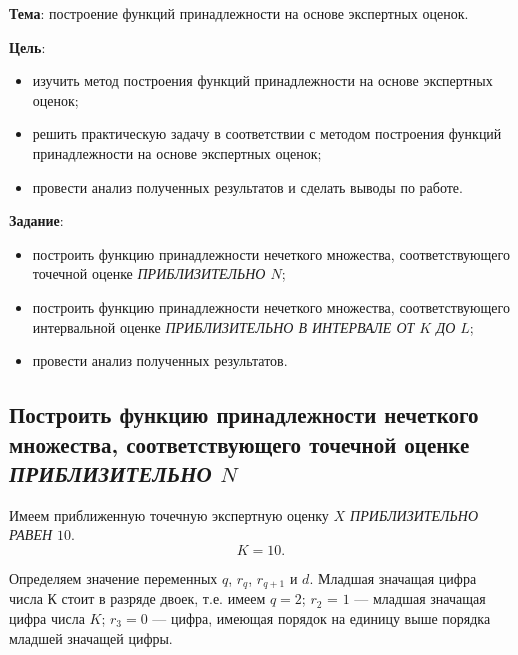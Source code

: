 


\newcommand{\labnumber}{4} %



\usepackage{systeme}
\usepackage{longtable,tabu}
\usepackage{multirow}
\usepackage{array,multirow}
\usepackage{pdflscape}
\usepackage{afterpage}
\usepackage{tikz}
\usepackage{bm}

\graphicspath{{figures/}}


\Russian


\addtocounter{page}{1}

\textbf{Тема}: построение функций принадлежности на основе экспертных оценок.

\textbf{Цель}: 
\begin{itemize}
	\item изучить метод построения функций принадлежности на основе экспертных оценок;
	\item решить практическую задачу в соответствии с методом построения функций принадлежности на основе экспертных оценок;
	\item провести анализ полученных результатов и сделать выводы по работе.
\end{itemize}

\textbf{Задание}: 
\begin{itemize}
	\item построить функцию принадлежности нечеткого множества, соответствующего точечной оценке \textit{ПРИБЛИЗИТЕЛЬНО $N$};
	\item построить функцию принадлежности нечеткого множества, соответствующего интервальной оценке \textit{ПРИБЛИЗИТЕЛЬНО В ИНТЕРВАЛЕ ОТ $K$ ДО $L$};
	\item провести анализ полученных результатов.
\end{itemize}

\subsection{Построить функцию принадлежности нечеткого множества, соответствующего точечной оценке \textit{ПРИБЛИЗИТЕЛЬНО $N$}}
Имеем приближенную точечную экспертную оценку \textit{$X$ ПРИБЛИЗИТЕЛЬНО РАВЕН $10$}.
\[
	K = 10.
\]

Определяем значение переменных $q$, $r_q$, $r_{q+1}$ и $d$. Младшая значащая цифра числа $К$ стоит в разряде двоек, т.е. имеем $q=2$; $r_2$ = $1$ --- младшая значащая цифра числа $K$; $r_3 = 0$ --- цифра, имеющая порядок на единицу выше порядка младшей значащей цифры.

